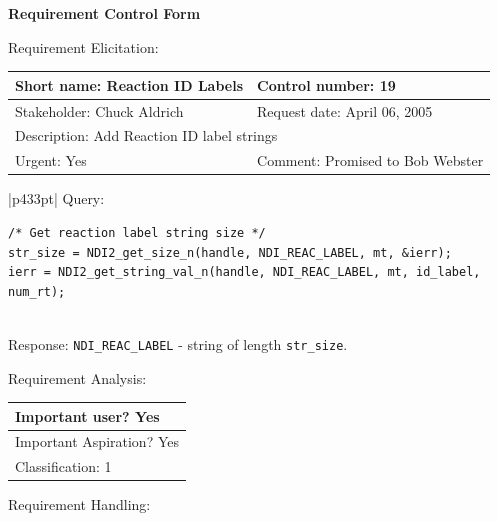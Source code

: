 \begin{center}\Large\bf
Requirement Control Form
\end{center}
\vspace{24pt}

Requirement Elicitation:

\begin{tabular}{|p{211pt}|p{211pt}|} \hline
Short name: Reaction ID Labels & Control number: 19\\ \hline
Stakeholder: Chuck Aldrich & Request date: April 06, 2005\\ \hline
\multicolumn{2}{|l|}{Description: Add Reaction ID label strings } \\ \hline
Urgent: Yes & Comment: Promised to Bob Webster\\ \hline
\end{tabular}

\vspace{12pt}

\begin{tabular}{|p{433pt}|} \hline
Query:
\begin{verbatim}
/* Get reaction label string size */
str_size = NDI2_get_size_n(handle, NDI_REAC_LABEL, mt, &ierr);
ierr = NDI2_get_string_val_n(handle, NDI_REAC_LABEL, mt, id_label, num_rt);
\end{verbatim}
\\ \hline
Response: \texttt{NDI\_REAC\_LABEL} - string of length
\texttt{str\_size}. \\ \hline
\end{tabular}
\vspace{24pt}

Requirement Analysis:

\begin{tabular}{|p{433pt}|} \hline
Important user? Yes \\ \hline
Important Aspiration? Yes \\ \hline
Classification: 1 \\ \hline
\end{tabular}
\vspace{24pt}

Requirement Handling:


